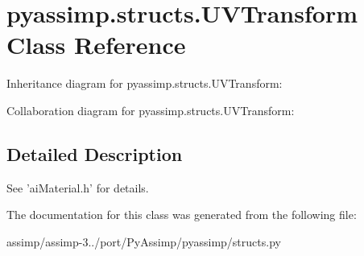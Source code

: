 \hypertarget{classpyassimp_1_1structs_1_1_u_v_transform}{\section{pyassimp.\+structs.\+U\+V\+Transform Class Reference}
\label{classpyassimp_1_1structs_1_1_u_v_transform}
}


Inheritance diagram for pyassimp.\+structs.\+U\+V\+Transform\+:


Collaboration diagram for pyassimp.\+structs.\+U\+V\+Transform\+:


\subsection{Detailed Description}
\begin{DoxyVerb}See 'aiMaterial.h' for details.
\end{DoxyVerb}
 

The documentation for this class was generated from the following file\+:\begin{DoxyCompactItemize}
\item 
assimp/assimp-\/3../port/\+Py\+Assimp/pyassimp/structs.\+py\end{DoxyCompactItemize}

